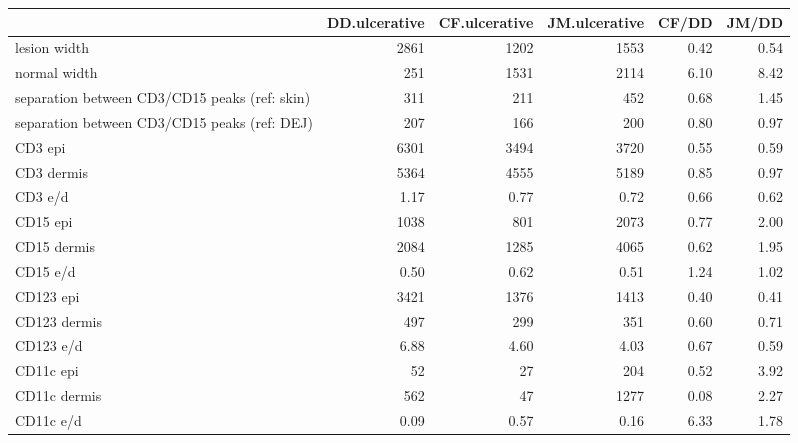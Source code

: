 \begin{tabular}{lrrrrr}
   \hline  &DD.ulcerative& CF.ulcerative& JM.ulcerative& CF/DD& JM/DD\\ 
\hline
lesion width & 2861 & 1202 & 1553 & 0.42 & 0.54 \\ 
  normal width & 251 & 1531 & 2114 & 6.10 & 8.42 \\ 
  separation between CD3/CD15 peaks (ref: skin) & 311 & 211 & 452 & 0.68 & 1.45 \\ 
  separation between CD3/CD15 peaks (ref: DEJ) & 207 & 166 & 200 & 0.80 & 0.97 \\ 
   \hline
CD3 epi & 6301 & 3494 & 3720 & 0.55 & 0.59 \\ 
  CD3 dermis & 5364 & 4555 & 5189 & 0.85 & 0.97 \\ 
  CD3 e/d & 1.17 & 0.77 & 0.72 & 0.66 & 0.62 \\ 
   \hline
CD15 epi & 1038 & 801 & 2073 & 0.77 & 2.00 \\ 
  CD15 dermis & 2084 & 1285 & 4065 & 0.62 & 1.95 \\ 
  CD15 e/d & 0.50 & 0.62 & 0.51 & 1.24 & 1.02 \\ 
   \hline
CD123 epi & 3421 & 1376 & 1413 & 0.40 & 0.41 \\ 
  CD123 dermis & 497 & 299 & 351 & 0.60 & 0.71 \\ 
  CD123 e/d & 6.88 & 4.60 & 4.03 & 0.67 & 0.59 \\ 
   \hline
CD11c epi & 52 & 27 & 204 & 0.52 & 3.92 \\ 
  CD11c dermis & 562 & 47 & 1277 & 0.08 & 2.27 \\ 
  CD11c e/d & 0.09 & 0.57 & 0.16 & 6.33 & 1.78 \\ 
   \hline
\end{tabular}
